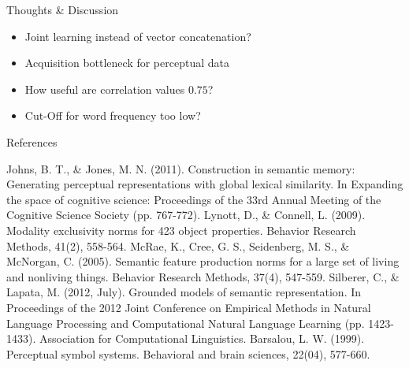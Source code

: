 \documentclass[12pt,a4paper]{beamer}
\begin{document}
\begin{frame}{Thoughts \& Discussion}
\begin{itemize}
\item Joint learning instead of vector concatenation?
\item Acquisition bottleneck for perceptual data
\item How useful are correlation values $0.75$?
\item Cut-Off for word frequency too low?
\end{itemize}
\end{frame}




\begin{frame}{References}
\begin{thebibliography}{-}
 Johns, B. T., \& Jones, M. N. (2011). Construction in semantic memory: Generating perceptual representations with global lexical similarity. In Expanding the space of cognitive science: Proceedings of the 33rd Annual Meeting of the Cognitive Science Society (pp. 767-772).
 Lynott, D., \& Connell, L. (2009). Modality exclusivity norms for 423 object properties. Behavior Research Methods, 41(2), 558-564.
 McRae, K., Cree, G. S., Seidenberg, M. S., \& McNorgan, C. (2005). Semantic feature production norms for a large set of living and nonliving things. Behavior Research Methods, 37(4), 547-559.
 Silberer, C., \& Lapata, M. (2012, July). Grounded models of semantic representation. In Proceedings of the 2012 Joint Conference on Empirical Methods in Natural Language Processing and Computational Natural Language Learning (pp. 1423-1433). Association for Computational Linguistics.
 Barsalou, L. W. (1999). Perceptual symbol systems. Behavioral and brain sciences, 22(04), 577-660.
\end{thebibliography}
\end{frame}
\end{document}

